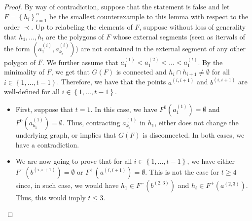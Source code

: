 \documentclass[12pt]{article}
\theoremstyle{definition}
\begin{document}
     \begin{proof}
         By way of contradiction,
         suppose that the statement is
         false and let
         $F = \left\{h_{i}\right\}_{i = 1}^{n}$ 
         be the smallest counterexample
         to this lemma with respect
         to the order $\prec$.
         Up to relabeling the elements
         of $F$, suppose without loss
         of generality that
         $h_{1}, \ldots, h_{t}$ are
         the polygons of $F$ whose
         external segments (seen as itervals
         of the form
         $\left(a_1^{\left(i\right)}, a_{k_{i}}^{\left(i\right)}\right)$) 
         are not contained
         in the external segment of 
         any other polygon of $F$.
         We further assume that
         $a_1^{\left(1\right)} <
         a_1^{\left(2\right)} < \ldots < 
         a_1^{\left(t\right)}$.
         By the minimality of $F$, we get
         that $G\left(F\right)$ is
         connected and $h_{i} \cap h_{i+1} \neq \emptyset$
         for all $i \in \left\{1, \ldots, t-1\right\}$.
         Therefore, we have that the points
         $a^{\left(i, i+1\right)}$ and
         $b^{\left(i, i+1\right)}$ are
         well-defined for all 
         $i \in \left\{1, \ldots, t-1\right\}$.
         
         \begin{itemize}
             \item First, suppose that $t = 1$.
             In this case, we have $F^{0}\left(a_1^{\left(1\right)}\right)
             = \emptyset$ and
             $F^{0}\left(a_{k_1}^{\left(1\right)}\right) = \emptyset$.
             Thus, contracting
             $a_{k_{i}}^{\left(1\right)}$ in $h_1$,
             either does not change the underlying graph,
             or implies that $G\left(F\right)$ is
             disconnected. In both cases, we have a contradiction.

             \item We are now going to prove that
             for all $i \in \left\{1, \ldots, t -1\right\}$,
             we have either $F^{-}\left(b^{\left(i, i+1\right)}\right)
             = \emptyset$ or 
             $F^{+}\left(a^{\left(i, i+1\right)}\right)
             = \emptyset$. This is
             not the case for $t \geq 4$ since,
             in such case, we would have 
             $h_1 \in F^{-}\left(b^{\left(2, 3\right)}\right)$
             and $h_{t} \in F^{+}\left(a^{\left(2, 3\right)}\right)$.
             Thus, this would imply $t \leq 3$.


\end{itemize}
\end{proof}
\end{document}
